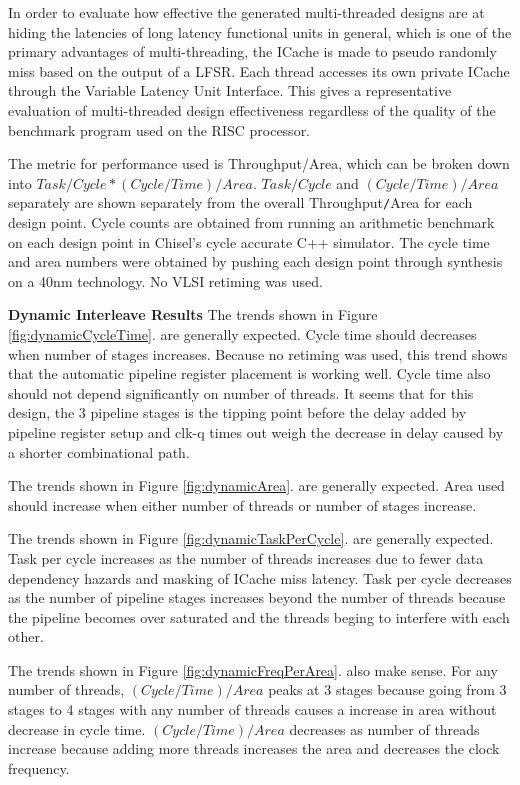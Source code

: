 In order to evaluate how effective the generated multi-threaded designs are at hiding the latencies of long latency functional units in general, which is one of the primary advantages of multi-threading, the ICache is made to pseudo randomly miss based on the output of a LFSR. Each thread accesses its own private ICache through the Variable Latency Unit Interface. This gives a representative evaluation of multi-threaded design effectiveness regardless of the quality of the benchmark program used on the RISC processor.

The metric for performance used is Throughput/Area, which can be broken down into $Task/Cycle * (Cycle/Time)/Area$. $Task/Cycle$ and $(Cycle/Time)/Area$ separately are shown separately from the overall Throughput{\tt /}Area for each design point. Cycle counts are obtained from running an arithmetic benchmark on each design point in Chisel's cycle accurate C++ simulator. The cycle time and area numbers were obtained by pushing each design point through synthesis on a 40nm technology. No VLSI retiming was used.

{\bf Dynamic Interleave Results}
The trends shown in Figure \ref{fig:dynamicCycleTime}. are generally expected. Cycle time should decreases when number of stages increases. Because no retiming was used, this trend shows that the automatic pipeline register placement is working well. Cycle time also should not depend significantly on number of threads. It seems that for this design, the 3 pipeline stages is the tipping point before the delay added by pipeline register setup and clk-q times out weigh the decrease in delay caused by a shorter combinational path. 

The trends shown in Figure \ref{fig:dynamicArea}. are generally expected.  Area used should increase when either number of threads or number of stages increase.

The trends shown in Figure \ref{fig:dynamicTaskPerCycle}. are generally expected. Task per cycle increases as the number of threads increases due to fewer data dependency hazards and masking of ICache miss latency. Task per cycle decreases as the number of pipeline stages increases beyond the number of threads because the pipeline becomes over saturated and the threads beging to interfere with each other.

The trends shown in Figure \ref{fig:dynamicFreqPerArea}. also make sense. For any number of threads, $(Cycle/Time)/Area$ peaks at 3 stages because going from 3 stages to 4 stages with any number of threads causes a increase in area without decrease in cycle time. $(Cycle/Time)/Area$ decreases as number of threads increase because adding more threads increases the area and decreases the clock frequency.

